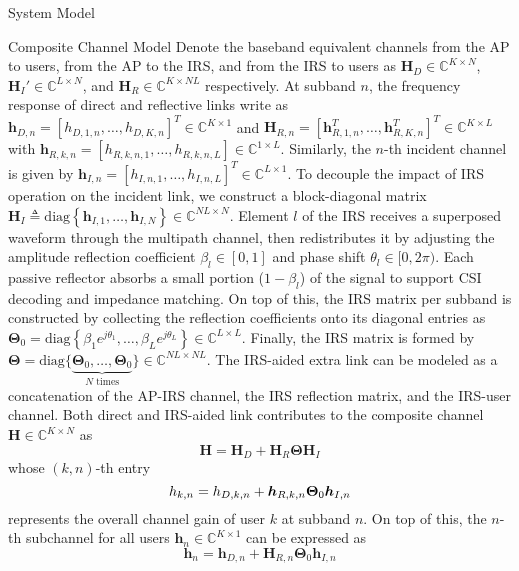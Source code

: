 \documentclass{IEEEtran}
\begin{document}
\begin{section}{System Model}
	\begin{subsection}{Composite Channel Model}
		Denote the baseband equivalent channels from the AP to users, from the AP to the IRS, and from the IRS to users as $\boldsymbol{H}_D \in \mathbb{C}^{K \times N}$, $\boldsymbol{H}_I' \in \mathbb{C}^{L \times N}$, and $\boldsymbol{H}_R \in \mathbb{C}^{K \times NL}$ respectively. At subband $n$, the frequency response of direct and reflective links write as $\boldsymbol{h}_{D,n}=[h_{D,1,n},\dots,h_{D,K,n}]^T \in \mathbb{C}^{K \times 1}$ and $\boldsymbol{H}_{R,n}=[\boldsymbol{h}_{R,1,n}^T,\dots,\boldsymbol{h}_{R,K,n}^T]^T \in \mathbb{C}^{K \times L}$ with $\boldsymbol{h}_{R,k,n}=[h_{R,k,n,1},\dots,h_{R,k,n,L}] \in \mathbb{C}^{1 \times L}$. Similarly, the $n$-th incident channel is given by $\boldsymbol{h}_{I,n}=[h_{I,n,1},\dots,h_{I,n,L}]^T \in \mathbb{C}^{L \times 1}$. To decouple the impact of IRS operation on the incident link, we construct a block-diagonal matrix $\boldsymbol{H}_I \triangleq \text{diag}\left\{\boldsymbol{h}_{I,1},\dots,\boldsymbol{h}_{I,N}\right\} \in \mathbb{C}^{NL \times N}$. Element $l$ of the IRS receives a superposed waveform through the multipath channel, then redistributes it by adjusting the amplitude reflection coefficient $\beta_l \in [0,1]$ and phase shift $\theta_l \in [0,2\pi)$. Each passive reflector absorbs a small portion ($1 - \beta_l$) of the signal to support CSI decoding and impedance matching. On top of this, the IRS matrix per subband is constructed by collecting the reflection coefficients onto its diagonal entries as $\boldsymbol{\Theta}_0 = \text{diag}\left\{\beta_1 e^{j \theta_1}, \dots, \beta_L e^{j \theta_L}\right\} \in \mathbb{C}^{L \times L}$. Finally, the IRS matrix is formed by $\boldsymbol{\Theta} = \text{diag}\{\underbrace{\boldsymbol{\Theta}_0,\dots,\boldsymbol{\Theta}_0}_{N\text{ times}}\} \in \mathbb{C}^{NL \times NL}$. The IRS-aided extra link can be modeled as a concatenation of the AP-IRS channel, the IRS reflection matrix, and the IRS-user channel. Both direct and IRS-aided link contributes to the composite channel $\boldsymbol{H} \in \mathbb{C}^{K \times N}$ as
		\begin{equation}\label{eq:H}
			\boldsymbol{H} = \boldsymbol{H}_D+\boldsymbol{H}_R\boldsymbol{\Theta}\boldsymbol{H}_I
		\end{equation}
		whose $(k,n)$-th entry
		\begin{equation}\label{eq:h_{k,n}}
			h_{k,n}=h_{D,k,n}+\boldsymbol{h}_{R,k,n}\boldsymbol{\Theta}_0\boldsymbol{h}_{I,n}
		\end{equation}
		represents the overall channel gain of user $k$ at subband $n$. On top of this, the $n$-th subchannel for all users $\boldsymbol{h}_n \in \mathbb{C}^{K \times 1}$ can be expressed as
		\begin{equation}\label{eq:h_n}
			\boldsymbol{h}_n=\boldsymbol{h}_{D,n}+\boldsymbol{H}_{R,n}\boldsymbol{\Theta}_0\boldsymbol{h}_{I,n}
		\end{equation}
	\end{subsection}


\end{section}
\end{document}

